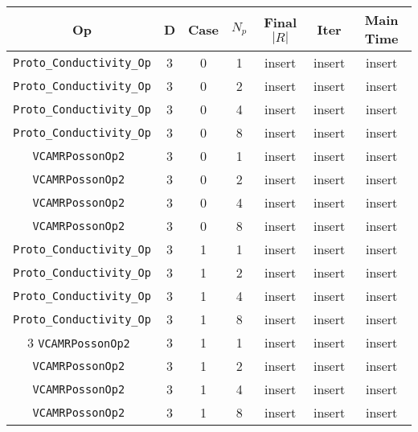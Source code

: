 \documentclass{article}
\begin{document}
\begin{small}
\begin{table}
\begin{center}
\begin{tabular}{|c|c|c|c|c|c||c|} \hline
 Op & D & Case & $N_p$ & Final $|R|$  &  Iter & Main Time \\
\hline
 {\tt Proto\_Conductivity\_Op} & 3 & 0 &   1    &  insert  &  insert    & insert   \\
 {\tt Proto\_Conductivity\_Op} & 3 & 0 &   2    &  insert  &  insert    & insert   \\
 {\tt Proto\_Conductivity\_Op} & 3 & 0 &   4    &  insert  &  insert    & insert   \\
 {\tt Proto\_Conductivity\_Op} & 3 & 0 &   8    &  insert  &  insert    & insert   \\
\hline                                                                               
 {\tt VCAMRPossonOp2 }         & 3 & 0   & 1    &  insert  &  insert    & insert    \\
 {\tt VCAMRPossonOp2 }         & 3 & 0   & 2    &  insert  &  insert    & insert    \\
 {\tt VCAMRPossonOp2 }         & 3 & 0   & 4    &  insert  &  insert    & insert    \\
 {\tt VCAMRPossonOp2 }         & 3 & 0   & 8    &  insert  &  insert    & insert    \\
\hline                                                                                     
 {\tt Proto\_Conductivity\_Op} & 3 & 1   & 1    &  insert  &  insert    & insert   \\
 {\tt Proto\_Conductivity\_Op} & 3 & 1   & 2    &  insert  &  insert    & insert   \\
 {\tt Proto\_Conductivity\_Op} & 3 & 1   & 4    &  insert  &  insert    & insert   \\
 {\tt Proto\_Conductivity\_Op} & 3 & 1   & 8    &  insert  &  insert    & insert   \\
\hline                           3                                                    
 {\tt VCAMRPossonOp2 }         & 3 & 1   & 1    &  insert  &  insert    & insert    \\
 {\tt VCAMRPossonOp2 }         & 3 & 1   & 2    &  insert  &  insert    & insert    \\
 {\tt VCAMRPossonOp2 }         & 3 & 1   & 4    &  insert  &  insert    & insert    \\
 {\tt VCAMRPossonOp2 }         & 3 & 1   & 8    &  insert  &  insert    & insert    \\

\end{tabular}
\end{center}
\end{table}
\end{small}
\end{document}
